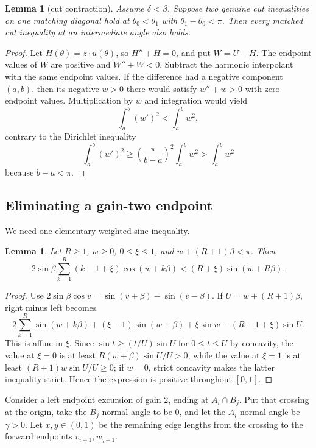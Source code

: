 \documentclass[11pt]{article}
\newtheorem{lemma}[theorem]{Lemma}
\theoremstyle{remark}
\begin{document}
\begin{lemma}[cut contraction]\label{lem:cutcontraction}
Assume $\delta<\beta$. Suppose two genuine cut inequalities on one matching diagonal hold at $\theta_0<\theta_1$ with $\theta_1-\theta_0<\pi$. Then every matched cut inequality at an intermediate angle also holds.
\end{lemma}

\begin{proof}
Let $H(\theta)=z\cdot u(\theta)$, so $H''+H=0$, and put $W=U-H$. The endpoint values of $W$ are positive and $W''+W<0$. Subtract the harmonic interpolant with the same endpoint values. If the difference had a negative component $(a,b)$, then its negative $w>0$ there would satisfy $w''+w>0$ with zero endpoint values. Multiplication by $w$ and integration would yield
\[
\int_a^b(w')^2<\int_a^bw^2,
\]
contrary to the Dirichlet inequality
\[
\int_a^b(w')^2\ge\left(\frac{\pi}{b-a}\right)^2\int_a^bw^2>\int_a^bw^2
\]
because $b-a<\pi$.
\end{proof}

\subsection{Eliminating a gain-two endpoint}

We need one elementary weighted sine inequality.

\begin{lemma}\label{lem:weighted-sine}
Let $R\ge1$, $w\ge0$, $0\le\xi\le1$, and $w+(R+1)\beta<\pi$. Then
\[
2\sin\beta\sum_{k=1}^{R}(k-1+\xi)\cos(w+k\beta)
<(R+\xi)\sin(w+R\beta).
\tag{5.1}
\]
\end{lemma}

\begin{proof}
Use $2\sin\beta\cos v=\sin(v+\beta)-\sin(v-\beta)$. If $U=w+(R+1)\beta$, right minus left becomes
\[
2\sum_{k=1}^{R}\sin(w+k\beta)+(\xi-1)\sin(w+\beta)+\xi\sin w-(R-1+\xi)\sin U.
\]
This is affine in $\xi$. Since $\sin t\ge (t/U)\sin U$ for $0\le t\le U$ by concavity, the value at $\xi=0$ is at least $R(w+\beta)\sin U/U>0$, while the value at $\xi=1$ is at least $(R+1)w\sin U/U\ge0$; if $w=0$, strict concavity makes the latter inequality strict. Hence the expression is positive throughout $[0,1]$.
\end{proof}

Consider a left endpoint excursion of gain $2$, ending at $A_i\cap B_j$. Put that crossing at the origin, take the $B_j$ normal angle to be $0$, and let the $A_i$ normal angle be $\gamma>0$. Let $x,y\in(0,1)$ be the remaining edge lengths from the crossing to the forward endpoints $v_{i+1},w_{j+1}$.
\end{document}
